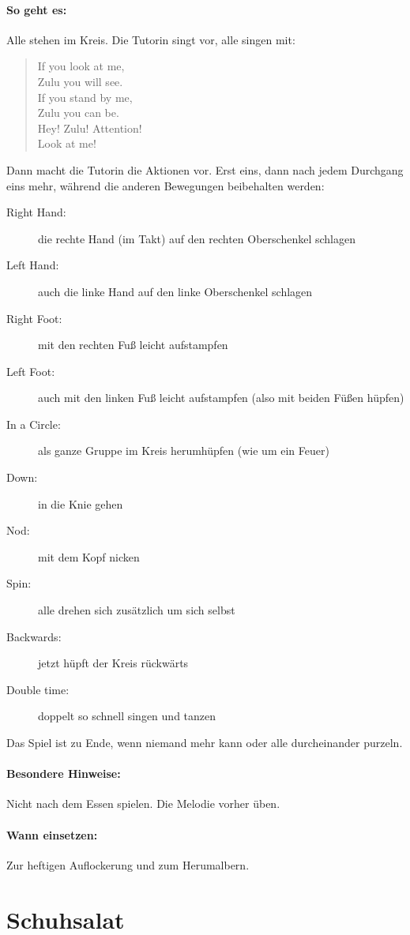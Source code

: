 \paragraph{So geht es:} Alle stehen im Kreis. Die Tutorin singt vor, alle singen mit:
\begin{quote}
  If you look at me,\\
  Zulu you will see.\\
  If you stand by me,\\
  Zulu you can be.\\
  Hey! Zulu! Attention!\\
  Look at me!
\end{quote}
Dann macht die Tutorin die Aktionen vor. Erst eins, dann nach jedem Durchgang eins mehr, während die anderen Bewegungen beibehalten werden:
\begin{description}
  \item[Right Hand:] die rechte Hand (im Takt) auf den rechten Oberschenkel schlagen
  \item[Left Hand:] auch die linke Hand auf den linke Oberschenkel schlagen
  \item[Right Foot:] mit den rechten Fuß leicht aufstampfen
  \item[Left Foot:] auch mit den linken Fuß leicht aufstampfen (also mit beiden Füßen hüpfen)
  \item[In a Circle:]  als ganze Gruppe im Kreis herumhüpfen (wie um ein Feuer)
  \item[Down:] in die Knie gehen
  \item[Nod:] mit dem Kopf nicken
  \item[Spin:] alle drehen sich zusätzlich um sich selbst
  \item[Backwards:] jetzt hüpft der Kreis rückwärts
  \item[Double time:] doppelt so schnell singen und tanzen
\end{description}
Das Spiel ist zu Ende, wenn niemand mehr kann oder alle durcheinander purzeln.
\paragraph{Besondere Hinweise:} Nicht nach dem Essen spielen. Die Melodie vorher üben.
\paragraph{Wann einsetzen:} Zur heftigen Auflockerung und zum Herumalbern.


\section{Schuhsalat}
